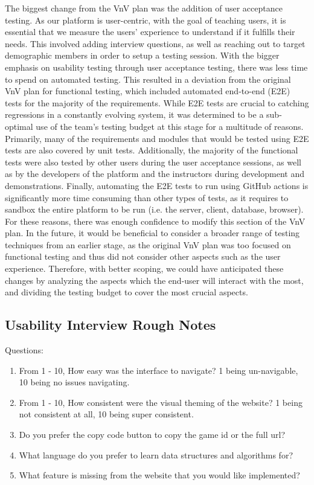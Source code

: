 \documentclass[12pt, titlepage]{article}
\begin{document}
  The biggest change from the VnV plan was the addition of user acceptance testing. As our platform is user-centric, with the goal of teaching users, it is essential that we measure the users' experience to understand if it fulfills their needs. This involved adding interview questions, as well as reaching out to target demographic members in order to setup a testing session. With the bigger emphasis on usability testing through user acceptance testing, there was less time to spend on automated testing. This resulted in a deviation from the original VnV plan for functional testing, which included automated end-to-end (E2E) tests for the majority of the requirements. While E2E tests are crucial to catching regressions in a constantly evolving system, it was determined to be a sub-optimal use of the team's testing budget at this stage for a multitude of reasons. Primarily, many of the requirements and modules that would be tested using E2E tests are also covered by unit tests. Additionally, the majority of the functional tests were also tested by other users during the user acceptance sessions, as well as by the developers of the platform and the instructors during development and demonstrations. Finally, automating the E2E tests to run using GitHub actions is significantly more time consuming than other types of tests, as it requires to sandbox the entire platform to be run (i.e. the server, client, database, browser). For these reasons, there was enough confidence to modify this section of the VnV plan. In the future, it would be beneficial to consider a broader range of testing techniques from an earlier stage, as the original VnV plan was too focused on functional testing and thus did not consider other aspects such as the user experience. Therefore, with better scoping, we could have anticipated these changes by analyzing the aspects which the end-user will interact with the most, and dividing the testing budget to cover the most crucial aspects.
  
\subsection{Usability Interview Rough Notes}\label{roughnotes}
Questions:
\begin{enumerate}
    \item From 1 - 10, How easy was the interface to navigate? 1 being un-navigable, 10 being no issues navigating.
    \item From 1 - 10, How consistent were the visual theming of the website? 1 being not consistent at all, 10 being super consistent. 
    \item Do you prefer the copy code button to copy the game id or the full url?
    \item What language do you prefer to learn data structures and algorithms for?
    \item What feature is missing from the website that you would like implemented?
\end{enumerate}
\end{document}
